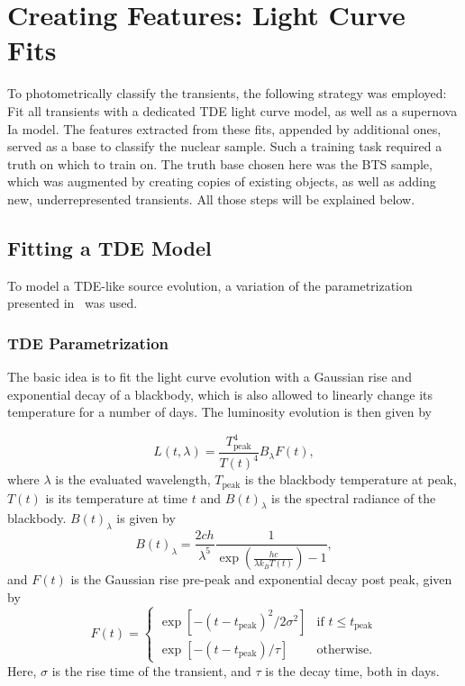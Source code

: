 \section{Creating Features: Light Curve Fits}
To photometrically classify the transients, the following strategy was employed: Fit all transients with a dedicated TDE light curve model, as well as a supernova Ia model. The features extracted from these fits, appended by additional ones, served as a base to classify the nuclear sample. Such a training task required a truth on which to train on. The truth base chosen here was the BTS sample, which was augmented by creating copies of existing objects, as well as adding new, underrepresented transients. All those steps will be explained below.

\subsection{Fitting a TDE Model}\label{tde_model}
To model a TDE-like source evolution, a variation of the parametrization presented in~\cite{Velzen2021a} was used.

\subsubsection{TDE Parametrization}
The basic  idea is to fit the light curve evolution with a Gaussian rise and exponential decay of a blackbody, which is also allowed to linearly change its temperature for a number of days. The luminosity evolution is then given by

\begin{equation}
  L(t,\lambda) = \frac{T_\text{peak}^4}{T(t)^4} B_\lambda F(t),
\end{equation}
where $\lambda$ is the evaluated wavelength, $T_\text{peak}$ is the blackbody temperature at peak, $T(t)$ is its temperature at time $t$ and $B(t)_\lambda$ is the spectral radiance of the blackbody. $B(t)_\lambda$ is given by
\begin{equation}
  B(t)_\lambda = \frac{2 c h}{\lambda^5} \frac{1}{\exp(\frac{hc}{\lambda k_B T(t)})-1},
\end{equation}
and $F(t)$ is the Gaussian rise pre-peak and exponential decay post peak, given by
\begin{equation}
  F(t) = \begin{cases}
    \exp[-(t-t_\text{peak})^2/2\sigma^2] & \text{if } t\leq t_\text{peak} \\
    \exp[-(t-t_\text{peak})/\tau]        & \text{otherwise.}
  \end{cases}
\end{equation}
Here, $\sigma$ is the rise time of the transient, and $\tau$ is the decay time, both in days.

